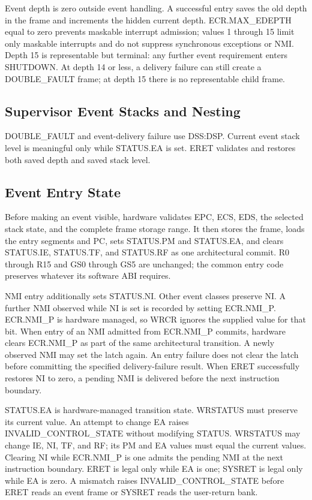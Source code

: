 Event depth is zero outside event handling. A successful entry saves the old depth in the frame and increments the
hidden current depth. ECR.MAX\_EDEPTH equal to zero prevents maskable interrupt admission; values 1 through 15 limit
only maskable interrupts and do not suppress synchronous exceptions or NMI. Depth 15 is representable but terminal:
any further event requirement enters SHUTDOWN. At depth 14 or less, a delivery failure can still create a
DOUBLE\_FAULT frame; at depth 15 there is no representable child frame.

\subsection{Supervisor Event Stacks and Nesting}


DOUBLE\_FAULT and event-delivery failure use DSS:DSP. Current event stack level is meaningful only while STATUS.EA
is set. ERET validates and restores both saved depth and saved stack level.

\subsection{Event Entry State}
Before making an event visible, hardware validates EPC, ECS, EDS, the selected stack state, and the complete frame
storage range. It then stores the frame, loads the entry segments and PC, sets STATUS.PM and STATUS.EA, and clears
STATUS.IE, STATUS.TF, and STATUS.RF as one architectural commit. R0 through R15 and GS0 through GS5 are unchanged;
the common entry code preserves whatever its software ABI requires.

NMI entry additionally sets STATUS.NI. Other event classes preserve NI. A further NMI observed while NI is set is
recorded by setting ECR.NMI\_P. ECR.NMI\_P is hardware managed, so WRCR ignores the supplied value for that bit.
When entry of an NMI admitted from ECR.NMI\_P commits, hardware clears ECR.NMI\_P as part of the same architectural
transition. A newly observed NMI may set the latch again. An entry failure does not clear the latch before committing
the specified delivery-failure result. When ERET successfully restores NI to zero, a pending NMI is delivered before
the next instruction boundary.

STATUS.EA is hardware-managed transition state. WRSTATUS must preserve its current value. An attempt to change EA
raises INVALID\_CONTROL\_STATE without modifying STATUS. WRSTATUS may change IE, NI, TF, and RF; its PM and EA
values must equal the current values. Clearing NI while ECR.NMI\_P is one admits the pending NMI at the next
instruction boundary. ERET is legal only while EA is one; SYSRET is legal only while EA is zero. A mismatch raises
INVALID\_CONTROL\_STATE before ERET reads an event frame or SYSRET reads the user-return bank.

